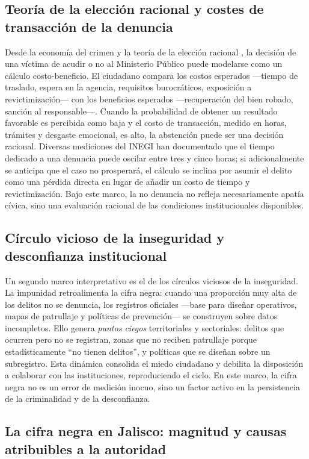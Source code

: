 \documentclass[10pt,twocolumn,letterpaper]{article}
\begin{document}
\subsection{Teoría de la elección racional y costes de transacción de la denuncia}

Desde la economía del crimen y la teoría de la elección racional
\cite{becker1968}, la decisión de una víctima de acudir o no al
Ministerio Público puede modelarse como un cálculo costo-beneficio. El
ciudadano compara los costos esperados —tiempo de traslado, espera en la
agencia, requisitos burocráticos, exposición a revictimización— con los
beneficios esperados —recuperación del bien robado, sanción al
responsable—. Cuando la probabilidad de obtener un resultado favorable
es percibida como baja y el costo de transacción, medido en horas,
trámites y desgaste emocional, es alto, la abstención puede ser una
decisión racional. Diversas mediciones del INEGI han documentado que el
tiempo dedicado a una denuncia puede oscilar entre tres y cinco horas;
si adicionalmente se anticipa que el caso no prosperará, el cálculo se
inclina por asumir el delito como una pérdida directa en lugar de añadir
un costo de tiempo y revictimización. Bajo este marco, la no denuncia no
refleja necesariamente apatía cívica, sino una evaluación racional de
las condiciones institucionales disponibles.

\subsection{Círculo vicioso de la inseguridad y desconfianza institucional}

Un segundo marco interpretativo es el de los círculos viciosos de la
inseguridad. La impunidad retroalimenta la cifra negra: cuando una
proporción muy alta de los delitos no se denuncia, los registros
oficiales —base para diseñar operativos, mapas de patrullaje y políticas
de prevención— se construyen sobre datos incompletos. Ello genera
\textit{puntos ciegos} territoriales y sectoriales: delitos que ocurren
pero no se registran, zonas que no reciben patrullaje porque
estadísticamente ``no tienen delitos'', y políticas que se diseñan sobre
un subregistro. Esta dinámica consolida el miedo ciudadano y debilita la
disposición a colaborar con las instituciones, reproduciendo el ciclo.
En este marco, la cifra negra no es un error de medición inocuo, sino un
factor activo en la persistencia de la criminalidad y de la
desconfianza.

\subsection{La cifra negra en Jalisco: magnitud y causas atribuibles a la autoridad}
\end{document}

